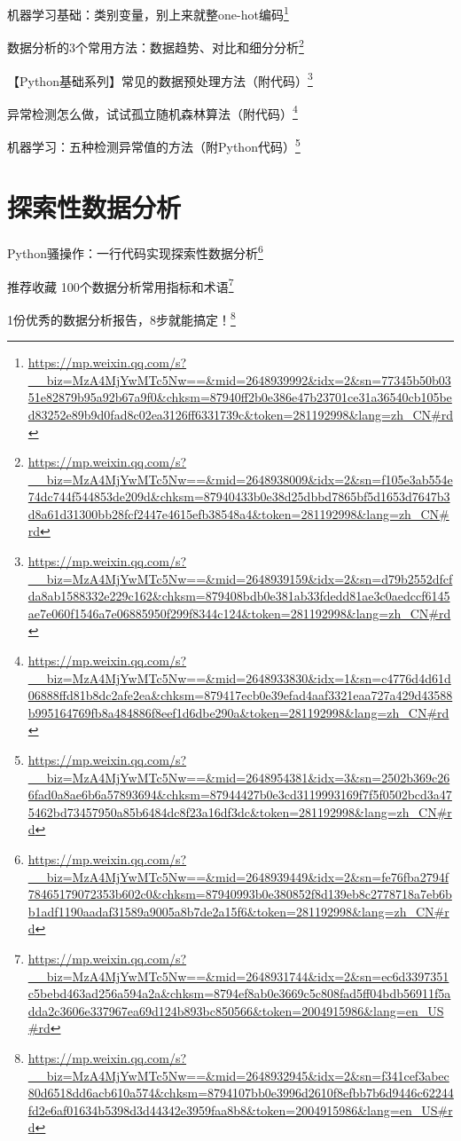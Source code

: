 \documentclass[]{ctexbook}
\renewcommand{\href}[2]{#2\footnote{\url{#1}}}
\begin{document}
\href{https://mp.weixin.qq.com/s?__biz=MzA4MjYwMTc5Nw==\&mid=2648939992\&idx=2\&sn=77345b50b0351e82879b95a92b67a9f0\&chksm=87940ff2b0e386e47b23701ce31a36540cb105bed83252e89b9d0fad8c02ea3126ff6331739c\&token=281192998\&lang=zh_CN\#rd}{机器学习基础：类别变量，别上来就整one-hot编码}

\href{https://mp.weixin.qq.com/s?__biz=MzA4MjYwMTc5Nw==\&mid=2648938009\&idx=2\&sn=f105e3ab554e74dc744f544853de209d\&chksm=87940433b0e38d25dbbd7865bf5d1653d7647b3d8a61d31300bb28fcf2447e4615efb38548a4\&token=281192998\&lang=zh_CN\#rd}{数据分析的3个常用方法：数据趋势、对比和细分分析}

\href{https://mp.weixin.qq.com/s?__biz=MzA4MjYwMTc5Nw==\&mid=2648939159\&idx=2\&sn=d79b2552dfcfda8ab1588332e229c162\&chksm=879408bdb0e381ab33fdedd81ae3c0aedccf6145ae7e060f1546a7e06885950f299f8344c124\&token=281192998\&lang=zh_CN\#rd}{【Python基础系列】常见的数据预处理方法（附代码）}

\href{https://mp.weixin.qq.com/s?__biz=MzA4MjYwMTc5Nw==\&mid=2648933830\&idx=1\&sn=c4776d4d61d06888ffd81b8dc2afe2ea\&chksm=879417ecb0e39efad4aaf3321eaa727a429d43588b995164769fb8a484886f8eef1d6dbe290a\&token=281192998\&lang=zh_CN\#rd}{异常检测怎么做，试试孤立随机森林算法（附代码）}

\href{https://mp.weixin.qq.com/s?__biz=MzA4MjYwMTc5Nw==\&mid=2648954381\&idx=3\&sn=2502b369c266fad0a8ae6b6a57893694\&chksm=87944427b0e3cd3119993169f7f5f0502bcd3a475462bd73457950a85b6484dc8f23a16df3dc\&token=281192998\&lang=zh_CN\#rd}{机器学习：五种检测异常值的方法（附Python代码）}

\hypertarget{ux63a2ux7d22ux6027ux6570ux636eux5206ux6790}{%
\section{探索性数据分析}\label{ux63a2ux7d22ux6027ux6570ux636eux5206ux6790}}

\href{https://mp.weixin.qq.com/s?__biz=MzA4MjYwMTc5Nw==\&mid=2648939449\&idx=2\&sn=fe76fba2794f78465179072353b602c0\&chksm=87940993b0e380852f8d139eb8c2778718a7eb6bb1adf1190aadaf31589a9005a8b7de2a15f6\&token=281192998\&lang=zh_CN\#rd}{Python骚操作：一行代码实现探索性数据分析}

\href{https://mp.weixin.qq.com/s?__biz=MzA4MjYwMTc5Nw==\&mid=2648931744\&idx=2\&sn=ec6d3397351c5bebd463ad256a594a2a\&chksm=8794ef8ab0e3669c5c808fad5ff04bdb56911f5adda2c3606e337967ea69d124b893bc850566\&token=2004915986\&lang=en_US\#rd}{推荐收藏 \textbar{} 100个数据分析常用指标和术语}

\href{https://mp.weixin.qq.com/s?__biz=MzA4MjYwMTc5Nw==\&mid=2648932945\&idx=2\&sn=f341cef3abec80d6518dd6acb610a574\&chksm=8794107bb0e3996d2610f8efbb7b6d9446c62244fd2e6af01634b5398d3d44342e3959faa8b8\&token=2004915986\&lang=en_US\#rd}{1份优秀的数据分析报告，8步就能搞定！}
\end{document}
